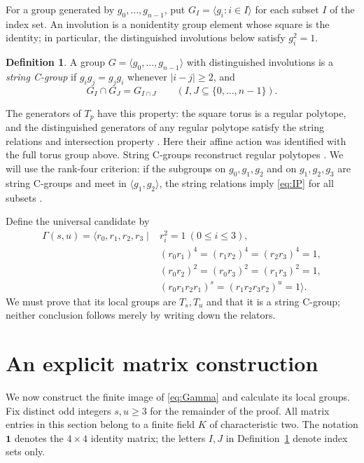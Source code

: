 \documentclass[11pt]{article}
\theoremstyle{definition}
\newtheorem{definition}[theorem]{Definition}
\newcommand{\ang}[1]{\langle #1\rangle}
\begin{document}
For a group generated by $g_0,\ldots,g_{n-1}$, put
$G_I=\ang{g_i:i\in I}$ for each subset $I$ of the index set.
An involution is a nonidentity group element whose square is the identity;
in particular, the distinguished involutions below satisfy $g_i^2=1$.
\begin{definition}\label{def:string}
A group $G=\ang{g_0,\ldots,g_{n-1}}$ with distinguished involutions is a
\emph{string C-group} if $g_i g_j=g_j g_i$ whenever $|i-j|\geq2$, and
\begin{equation}\label{eq:IP}
                  G_I\cap G_J=G_{I\cap J}
          \qquad(I,J\subseteq\{0,\ldots,n-1\}).
\end{equation}
\end{definition}
The generators of $T_p$ have this property: the square torus is a regular
polytope, and the distinguished generators of any regular polytope satisfy
the string relations and intersection property \cite[Section 2]{SW}.
Here their affine action was identified with the full torus group above.
String C-groups reconstruct regular
polytopes \cite[Theorem 2E11]{ARP}. We will use the rank-four criterion:
if the subgroups on $g_0,g_1,g_2$ and on $g_1,g_2,g_3$ are string
C-groups and meet in $\ang{g_1,g_2}$, the string relations imply
\eqref{eq:IP} for all subsets \cite[Proposition 2E16]{ARP}.

Define the universal candidate by
\begin{equation}\label{eq:Gamma}
\begin{split}
 \Gamma(s,u)=\ang{r_0,r_1,r_2,r_3\mid {}&r_i^2=1\ (0\leq i\leq3),\\
 &(r_0r_1)^4=(r_1r_2)^4=(r_2r_3)^4=1,\\
 &(r_0r_2)^2=(r_0r_3)^2=(r_1r_3)^2=1,\\
 &(r_0r_1r_2r_1)^s=(r_1r_2r_3r_2)^u=1}.
\end{split}
\end{equation}
We must prove that its local groups are $T_s,T_u$ and that it is a
string C-group;
neither conclusion follows merely by writing down the relators.

\section{An explicit matrix construction}\label{sec:matrices}
We now construct the finite image of \eqref{eq:Gamma} and calculate its
local groups. Fix distinct odd integers $s,u\geq3$ for the remainder of
the proof. All matrix entries in this section belong to a finite field
$K$ of characteristic two. The notation $\mathbf 1$ denotes the
$4\times4$ identity matrix; the letters $I,J$ in
Definition~\ref{def:string} denote index sets only.
\end{document}
